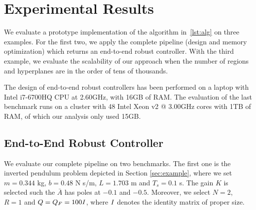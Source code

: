 \section{Experimental Results}\label{sec:experiments}



We evaluate a prototype implementation of the algorithm in~\autoref{lst:alg}
on three examples. For the first two, we apply the complete pipeline (design and memory optimization)
which returns an end-to-end robust controller. With the third example, we evaluate
the scalability of our approach when the number of regions and hyperplanes are in
the order of tens of thousands.


The design of end-to-end robust controllers has been performed on a laptop with Intel i7-6700HQ CPU at
2.60GHz, with 16GB of RAM. The evaluation of the last benchmark runs on a
cluster with 48 Intel Xeon v2 @ 3.00GHz cores with 1TB of RAM, of which our analysis
only used 15GB.

\subsection{End-to-End Robust Controller}

We evaluate our complete pipeline on two benchmarks. 
The first one is the inverted pendulum problem depicted in Section \ref{sec:example}, where we set
$m=0.344$ kg, $b=0.48$ N s/m, $L=1.703$ m and $T_s=0.1$ s. The gain $K$ is
selected such the $\bar A$ has poles at $-0.1$ and $-0.5$. Moreover, we select
$N=2$, $R=1$ and $Q=Q_F=100\mathbf{\it I}$, where $\mathbf{ \it I}$ denotes the
identity matrix of proper size. 

